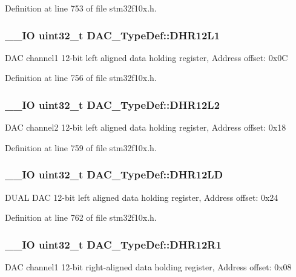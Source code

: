 Definition at line 753 of file stm32f10x.\-h.

\hypertarget{struct_d_a_c___type_def_a5eb63912e39085e3e13d64bdb0cf38bd}{
\subsubsection[{D\-H\-R12\-L1}]{\setlength{\rightskip}{0pt plus 5cm}\-\_\-\-\_\-\-I\-O {\bf uint32\-\_\-t} D\-A\-C\-\_\-\-Type\-Def\-::\-D\-H\-R12\-L1}}\label{struct_d_a_c___type_def_a5eb63912e39085e3e13d64bdb0cf38bd}
D\-A\-C channel1 12-\/bit left aligned data holding register, Address offset\-: 0x0\-C 

Definition at line 756 of file stm32f10x.\-h.

\hypertarget{struct_d_a_c___type_def_a9f612b6b3e065e810e5a2fb254d6a40b}{
\subsubsection[{D\-H\-R12\-L2}]{\setlength{\rightskip}{0pt plus 5cm}\-\_\-\-\_\-\-I\-O {\bf uint32\-\_\-t} D\-A\-C\-\_\-\-Type\-Def\-::\-D\-H\-R12\-L2}}\label{struct_d_a_c___type_def_a9f612b6b3e065e810e5a2fb254d6a40b}
D\-A\-C channel2 12-\/bit left aligned data holding register, Address offset\-: 0x18 

Definition at line 759 of file stm32f10x.\-h.

\hypertarget{struct_d_a_c___type_def_aea4d055e3697999b44cdcf2702d79d40}{
\subsubsection[{D\-H\-R12\-L\-D}]{\setlength{\rightskip}{0pt plus 5cm}\-\_\-\-\_\-\-I\-O {\bf uint32\-\_\-t} D\-A\-C\-\_\-\-Type\-Def\-::\-D\-H\-R12\-L\-D}}\label{struct_d_a_c___type_def_aea4d055e3697999b44cdcf2702d79d40}
D\-U\-A\-L D\-A\-C 12-\/bit left aligned data holding register, Address offset\-: 0x24 

Definition at line 762 of file stm32f10x.\-h.

\hypertarget{struct_d_a_c___type_def_afbfd2855cdb81939b4efc58e08aaf3e5}{
\subsubsection[{D\-H\-R12\-R1}]{\setlength{\rightskip}{0pt plus 5cm}\-\_\-\-\_\-\-I\-O {\bf uint32\-\_\-t} D\-A\-C\-\_\-\-Type\-Def\-::\-D\-H\-R12\-R1}}\label{struct_d_a_c___type_def_afbfd2855cdb81939b4efc58e08aaf3e5}
D\-A\-C channel1 12-\/bit right-\/aligned data holding register, Address offset\-: 0x08 

